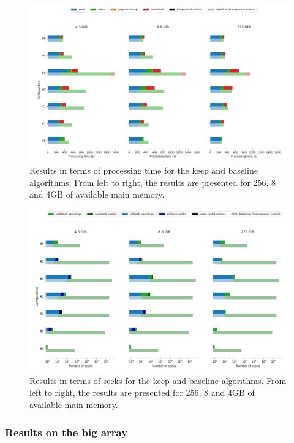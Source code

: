 \documentclass[sigconf, nonacm]{acmart}
\begin{document}
\begin{figure}[h]
  \centering
  \includegraphics[scale=0.45]{./figures/time_3500.png}
  \caption{Results in terms of processing time for the keep and baseline algorithms. From left to right, the results are presented for 256, 8 and 4GB of available main memory.}
  \label{fig:time_3500}
\end{figure}

\begin{figure}[h]
    \centering
    \includegraphics[scale=0.45]{./figures/seeks_3500.png}
    \caption{Results in terms of seeks for the keep and baseline algorithms. From left to right, the results are presented for 256, 8 and 4GB of available main memory.}
    \label{fig:seeks_3500}
  \end{figure}

\subsubsection{Results on the big array}
\end{document}
